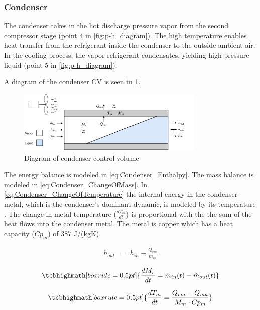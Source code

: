 \subsubsection{Condenser}\label{sec:condenser}
The condenser takes in the hot discharge pressure vapor from the second compressor stage (point 4 in \cref{fig:p-h_diagram}). The high temperature enables heat transfer from the refrigerant inside the condenser to the outside ambient air. In the cooling process, the vapor refrigerant condensates, yielding high pressure liquid (point 5 in \cref{fig:p-h_diagram}).

A diagram of the condenser CV is seen in \cref{fig:condenser_CV}.

\begin{figure}[h!]
	\centering
	\includegraphics[width=0.8\textwidth]{Graphics/Condenser.pdf}
	\caption{Diagram of condenser control volume}
	\label{fig:condenser_CV}
\end{figure}

The energy balance is modeled in \cref{eq:Condenser_Enthalpy}. The mass balance is modeled in \cref{eq:Condenser_ChangeOfMass}. In \cref{eq:Condenser_ChangeOfTemperature} the internal energy in the condenser metal, which is the condenser's dominant dynamic, is modeled by its temperature \cite{Sorensen2013}. The change in metal temperature ($\frac{dT_m}{dt}$) is proportional with the the sum of the heat flows into the condenser metal. The metal is copper which has a heat capacity ($Cp_m$) of $387$ \si{J}/(\si{kg}\si{K}).

\begin{align}
	h_{out} 			& = h_{in} - \frac{Q_{rm}}{\dot{m}_{in}}  	\label{eq:Condenser_Enthalpy}
\end{align}

\begin{equation}
	\tcbhighmath[boxrule = 0.5pt]{ 	\frac{dM_r}{dt} 	 = \dot{m}_{in}(t) - \dot{m}_{out}(t) }     	\label{eq:Condenser_ChangeOfMass}
\end{equation}

\begin{equation}
	\tcbhighmath[boxrule = 0.5pt]{ 	\frac{dT_m}{dt} 	 = \frac{Q_{rm} - Q_{ma}}{M_m \cdot Cp_m}	 }     \label{eq:Condenser_ChangeOfTemperature}
\end{equation}

